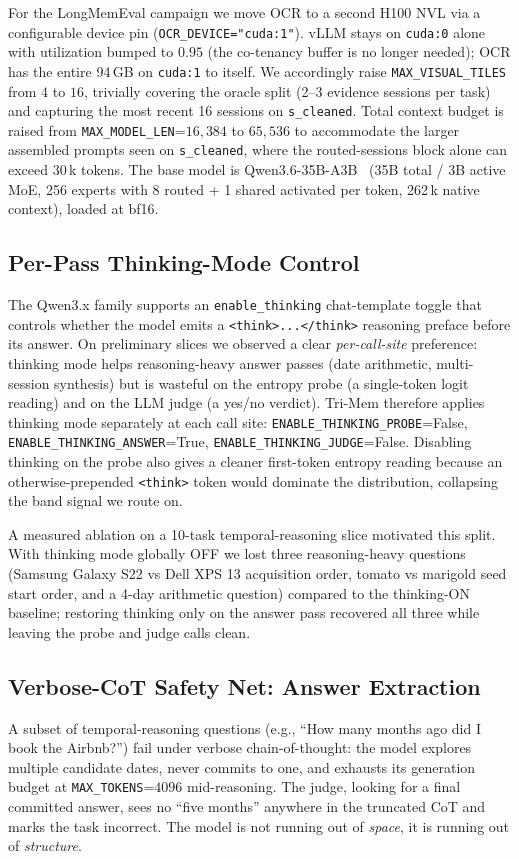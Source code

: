 \documentclass[conference]{IEEEtran}
\begin{document}
For the LongMemEval campaign we move OCR to a second H100 NVL via a configurable device pin (\texttt{OCR\_DEVICE="cuda:1"}). vLLM stays on \texttt{cuda:0} alone with utilization bumped to $0.95$ (the co-tenancy buffer is no longer needed); OCR has the entire 94\,GB on \texttt{cuda:1} to itself. We accordingly raise \texttt{MAX\_VISUAL\_TILES} from $4$ to $16$, trivially covering the oracle split (2--3 evidence sessions per task) and capturing the most recent 16 sessions on \texttt{s\_cleaned}. Total context budget is raised from \texttt{MAX\_MODEL\_LEN}=$16{,}384$ to $65{,}536$ to accommodate the larger assembled prompts seen on \texttt{s\_cleaned}, where the routed-sessions block alone can exceed 30\,k tokens. The base model is Qwen3.6-35B-A3B~\cite{qwen3report} (35B total / 3B active MoE, 256 experts with 8 routed + 1 shared activated per token, 262\,k native context), loaded at bf16.

\subsection{Per-Pass Thinking-Mode Control}
The Qwen3.x family supports an \texttt{enable\_thinking} chat-template toggle that controls whether the model emits a \texttt{<think>...</think>} reasoning preface before its answer. On preliminary slices we observed a clear \textit{per-call-site} preference: thinking mode helps reasoning-heavy answer passes (date arithmetic, multi-session synthesis) but is wasteful on the entropy probe (a single-token logit reading) and on the LLM judge (a yes/no verdict). Tri-Mem therefore applies thinking mode separately at each call site: \texttt{ENABLE\_THINKING\_PROBE}=False, \texttt{ENABLE\_THINKING\_ANSWER}=True, \texttt{ENABLE\_THINKING\_JUDGE}=False. Disabling thinking on the probe also gives a cleaner first-token entropy reading because an otherwise-prepended \texttt{<think>} token would dominate the distribution, collapsing the band signal we route on.

A measured ablation on a 10-task temporal-reasoning slice motivated this split. With thinking mode globally OFF we lost three reasoning-heavy questions (Samsung Galaxy S22 vs Dell XPS 13 acquisition order, tomato vs marigold seed start order, and a 4-day arithmetic question) compared to the thinking-ON baseline; restoring thinking only on the answer pass recovered all three while leaving the probe and judge calls clean.

\subsection{Verbose-CoT Safety Net: Answer Extraction}
\label{subsec:extractor}
A subset of temporal-reasoning questions (e.g., ``How many months ago did I book the Airbnb?'') fail under verbose chain-of-thought: the model explores multiple candidate dates, never commits to one, and exhausts its generation budget at \texttt{MAX\_TOKENS}=$4096$ mid-reasoning. The judge, looking for a final committed answer, sees no ``five months'' anywhere in the truncated CoT and marks the task incorrect. The model is not running out of \textit{space}, it is running out of \textit{structure}.
\end{document}
